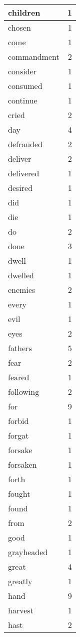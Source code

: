 \begin{center}
\begin{longtable}{l|r}
children & 1 \\ \hline
chosen & 1 \\ \hline
come & 1 \\ \hline
commandment & 2 \\ \hline
consider & 1 \\ \hline
consumed & 1 \\ \hline
continue & 1 \\ \hline
cried & 2 \\ \hline
day & 4 \\ \hline
defrauded & 2 \\ \hline
deliver & 2 \\ \hline
delivered & 1 \\ \hline
desired & 1 \\ \hline
did & 1 \\ \hline
die & 1 \\ \hline
do & 2 \\ \hline
done & 3 \\ \hline
dwell & 1 \\ \hline
dwelled & 1 \\ \hline
enemies & 2 \\ \hline
every & 1 \\ \hline
evil & 1 \\ \hline
eyes & 2 \\ \hline
fathers & 5 \\ \hline
fear & 2 \\ \hline
feared & 1 \\ \hline
following & 2 \\ \hline
for & 9 \\ \hline
forbid & 1 \\ \hline
forgat & 1 \\ \hline
forsake & 1 \\ \hline
forsaken & 1 \\ \hline
forth & 1 \\ \hline
fought & 1 \\ \hline
found & 1 \\ \hline
from & 2 \\ \hline
good & 1 \\ \hline
grayheaded & 1 \\ \hline
great & 4 \\ \hline
greatly & 1 \\ \hline
hand & 9 \\ \hline
harvest & 1 \\ \hline
hast & 2 \\ \hline

\end{longtable}
\end{center}
